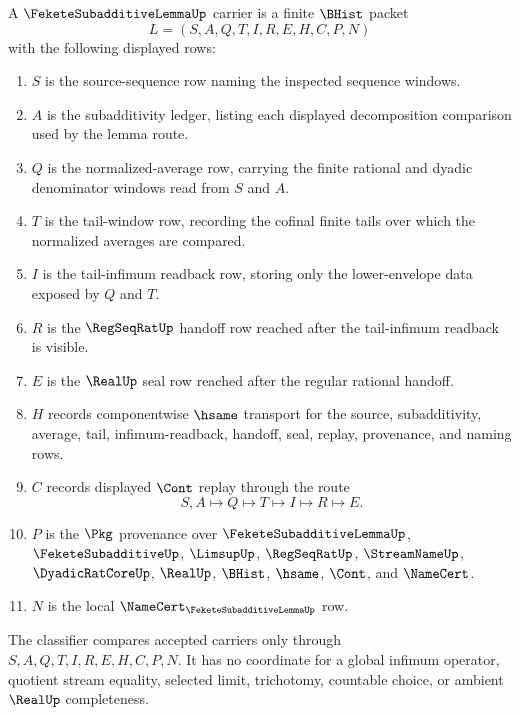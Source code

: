 \begin{definition}
\label{def:fekete-subadditive-lemma-carrier}
A $\FeketeSubadditiveLemmaUp$ carrier is a finite $\BHist$ packet
$$
L=(S,A,Q,T,I,R,E,H,C,P,N)
$$
with the following displayed rows:
\begin{enumerate}
\item $S$ is the source-sequence row naming the inspected sequence windows.
\item $A$ is the subadditivity ledger, listing each displayed decomposition comparison used by the lemma route.
\item $Q$ is the normalized-average row, carrying the finite rational and dyadic denominator windows read from $S$ and $A$.
\item $T$ is the tail-window row, recording the cofinal finite tails over which the normalized averages are compared.
\item $I$ is the tail-infimum readback row, storing only the lower-envelope data exposed by $Q$ and $T$.
\item $R$ is the $\RegSeqRatUp$ handoff row reached after the tail-infimum readback is visible.
\item $E$ is the $\RealUp$ seal row reached after the regular rational handoff.
\item $H$ records componentwise $\hsame$ transport for the source, subadditivity, average, tail, infimum-readback, handoff, seal, replay, provenance, and naming rows.
\item $C$ records displayed $\Cont$ replay through the route
$$
S,A\longmapsto Q\longmapsto T\longmapsto I\longmapsto R\longmapsto E .
$$
\item $P$ is the $\Pkg$ provenance over $\FeketeSubadditiveLemmaUp$, $\FeketeSubadditiveUp$, $\LimsupUp$, $\RegSeqRatUp$, $\StreamNameUp$, $\DyadicRatCoreUp$, $\RealUp$, $\BHist$, $\hsame$, $\Cont$, and $\NameCert$.
\item $N$ is the local $\NameCert_{\FeketeSubadditiveLemmaUp}$ row.
\end{enumerate}
The classifier compares accepted carriers only through $S,A,Q,T,I,R,E,H,C,P,N$. It has no coordinate for a global infimum operator, quotient stream equality, selected limit, trichotomy, countable choice, or ambient $\RealUp$ completeness.
\end{definition}

